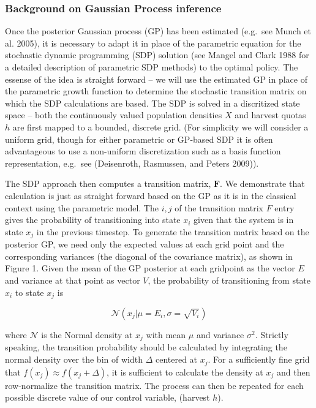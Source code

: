 \documentclass[author-year, review]{elsarticle} %
\begin{document}
\subsubsection{Background on Gaussian Process inference}

Once the posterior Gaussian process (GP) has been estimated (e.g.~see
Munch et al. 2005), it is necessary to adapt it in place of the
parametric equation for the stochastic dynamic programming (SDP)
solution (see Mangel and Clark 1988 for a detailed description of
parametric SDP methods) to the optimal policy. The essense of the idea
is straight forward -- we will use the estimated GP in place of the
parametric growth function to determine the stochastic transition matrix
on which the SDP calculations are based. The SDP is solved in a
discritized state space -- both the continuously valued population
densities $X$ and harvest quotas $h$ are first mapped to a bounded,
discrete grid. (For simplicity we will consider a uniform grid, though
for either parametric or GP-based SDP it is often advantageous to use a
non-uniform discretization such as a basis function representation,
e.g.~see (Deisenroth, Rasmussen, and Peters 2009)).

The SDP approach then computes a transition matrix, $\mathbf{F}$. We
demonstrate that calculation is just as straight forward based on the GP
as it is in the classical context using the parametric model. The
${i,j}$ of the transition matrix $F$ entry gives the probability of
transitioning into state $x_i$ given that the system is in state $x_j$
in the previous timestep. To generate the transition matrix based on the
posterior GP, we need only the expected values at each grid point and
the corresponding variances (the diagonal of the covariance matrix), as
shown in Figure 1. Given the mean of the GP posterior at each gridpoint
as the vector $E$ and variance at that point as vector $V$, the
probability of transitioning from state $x_i$ to state $x_j$ is

\[\mathcal{N}\left(x_j \vert  \mu = E_i, \sigma = \sqrt{V_i}\right)\]

where $\mathcal{N}$ is the Normal density at $x_j$ with mean $\mu$ and
variance $\sigma^2$. Strictly speaking, the transition probability
should be calculated by integrating the normal density over the bin of
width $\Delta$ centered at $x_j$. For a sufficiently fine grid that
$f(x_j) \approx f(x_j + \Delta)$, it is sufficient to calculate the
density at $x_j$ and then row-normalize the transition matrix. The
process can then be repeated for each possible discrete value of our
control variable, (harvest $h$).
\end{document}
